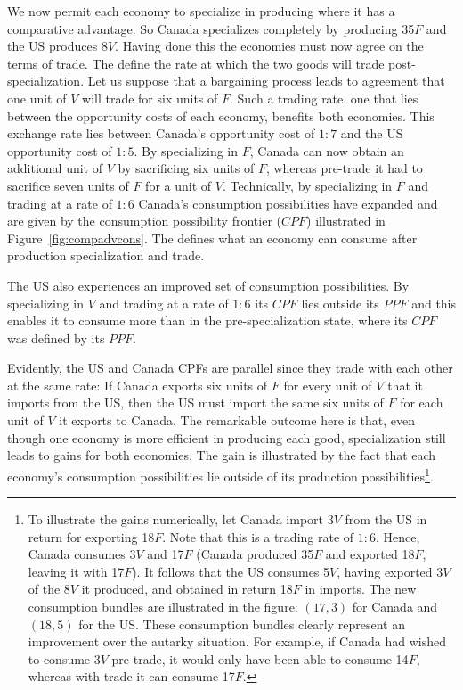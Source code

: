 We now permit each economy to specialize in producing where it has a
comparative advantage. So Canada specializes completely by producing 35$F$
and the US produces 8$V$. Having done this the economies must now agree on
the terms of trade. The  define the rate at
which the two goods will trade post-specialization. Let us suppose that a
bargaining process leads to agreement that one unit of $V$ will trade for
six units of $F$. Such a trading rate, one that lies between the opportunity
costs of each economy, benefits both economies. This exchange rate lies 
between Canada's opportunity cost of $1:7$ and the US opportunity cost of $1:5$. 
By specializing in $F$, Canada can now obtain an additional unit of $V$ by sacrificing six units of 
$F$, whereas pre-trade it had to sacrifice seven units of $F$ for a unit of $V$. 
Technically, by specializing in $F$ and trading at a rate of $1:6$ Canada's
consumption possibilities have expanded and are given by the consumption
possibility frontier ($CPF$) illustrated in Figure~\ref{fig:compadvcons}.
The  defines what an economy
can consume after production specialization and trade.



\newhtmlpage

The US also experiences an improved set of consumption possibilities. By
specializing in $V$ and trading at a rate of $1:6$ its $CPF$ lies outside its $%
PPF$ and this enables it to consume more than in the pre-specialization
state, where its $CPF$ was defined by its $PPF$.

Evidently, the US and Canada CPFs are parallel since they trade with each
other at the same rate: If Canada exports six units of $F$ for every unit of 
$V$ that it imports from the US, then the US must import the same six units
of $F$ for each unit of $V$ it exports to Canada. The remarkable outcome
here is that, even though one economy is more efficient in producing each
good, specialization still leads to gains for both economies. The gain is
illustrated by the fact that each economy's consumption possibilities lie
outside of its production possibilities\footnote{%
To illustrate the gains numerically, let Canada import 3$V$ from the US in
return for exporting 18$F$. Note that this is a trading rate of $1:6$. Hence,
Canada consumes 3$V$ and 17$F$ (Canada produced 35$F$ and exported 18$F$,
leaving it with 17$F$). It follows that the US consumes 5$V$, having
exported 3$V$ of the 8$V$ it produced, and obtained in return 18$F$ in
imports. The new consumption bundles are illustrated in the figure: $(17,3)
$ for Canada and $(18,5)$ for the US. These consumption bundles clearly
represent an improvement over the autarky situation. For example, if Canada
had wished to consume 3$V$ pre-trade, it would only have been able to
consume 14$F$, whereas with trade it can consume 17$F$.}.

